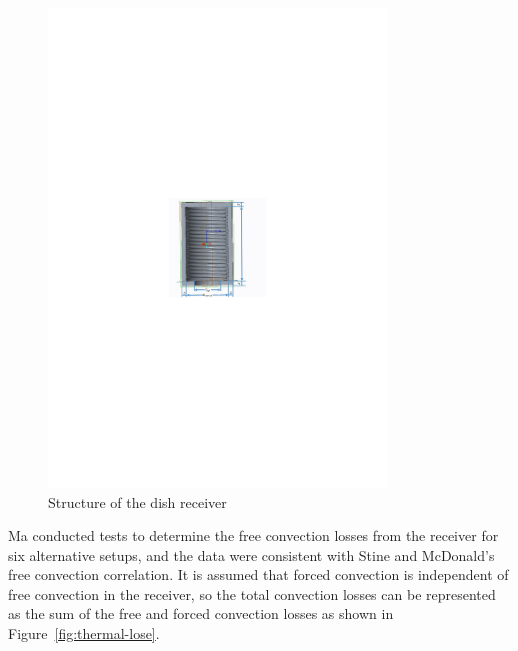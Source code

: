 \documentclass{article}
\begin{document}
\noindent \begin{figure}[htbp]
\begin{center}
	\includegraphics[width = 0.8\textwidth]{./graphics/dishReceiver}
	\caption{Structure of the dish receiver}
	\label{fig:dishReceiver}
\end{center}
\end{figure}
Ma conducted tests to determine the free convection losses from the receiver for six alternative setups, and the data were consistent with Stine and McDonald's free convection correlation\cite{Ma1993}. It is assumed that forced convection is independent of free convection in the receiver, so the total convection losses can be represented as the sum of the free and forced convection losses as shown in Figure~\ref{fig:thermal-lose}.
\end{document}
